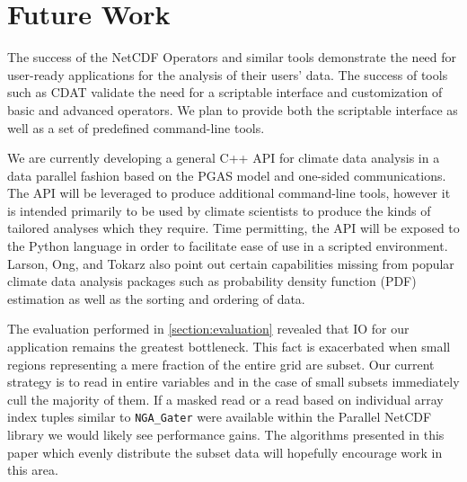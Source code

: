 \section{Future Work}
\label{section:future}

The success of the NetCDF Operators\cite{NCO} and similar tools demonstrate
the need for user-ready applications for the analysis of their users' data.  
The success of tools such as CDAT\cite{CDAT} validate the need for a
scriptable interface and customization of basic and advanced operators.  We
plan to provide both the scriptable interface as well as a set of predefined
command-line tools.

We are currently developing a general C++ API for climate data analysis in a
data parallel fashion based on the PGAS model and one-sided communications.
The API will be leveraged to produce additional command-line tools, however it
is intended primarily to be used by climate scientists to produce the kinds of
tailored analyses which they require.  Time permitting, the API will be
exposed to the Python language in order to facilitate ease of use in a
scripted environment.  Larson, Ong, and Tokarz also point out certain
capabilities missing from popular climate data analysis packages such as
probability density function (PDF) estimation as well as the sorting and
ordering of data.

The evaluation performed in \ref{section:evaluation} revealed that IO for our
application remains the greatest bottleneck.  This fact is exacerbated when
small regions representing a mere fraction of the entire grid are subset.  Our
current strategy is to read in entire variables and in the case of small
subsets immediately cull the majority of them.  If a masked read or a read
based on individual array index tuples similar to \verb+NGA_Gater+ were
available within the Parallel NetCDF library we would likely see performance
gains.  The algorithms presented in this paper which evenly distribute the
subset data will hopefully encourage work in this area.
